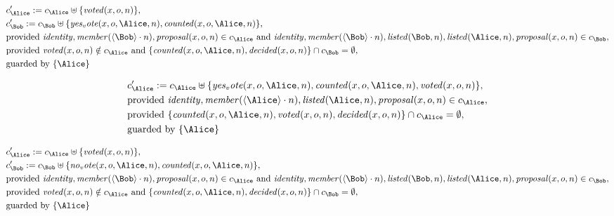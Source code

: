 \begin{align*}
&
c'_
{
\Alice
}
 := 
c_
{
\Alice
}
 \uplus 
\{
\mathit{
voted
}
(
x
,
o
,
n
)
\}
,\\
&
c'_
{
\Bob
}
 := 
c_
{
\Bob
}
 \uplus 
\{
\mathit{
yes_vote
}
(
x
,
o
,
\Alice
,
n
)
,
\mathit{
counted
}
(
x
,
o
,
\Alice
,
n
)
\}
,\\
&
\text{provided } 
\mathit{
identity
}
,
\mathit{
member
}
(
\langle
\Bob
\rangle
\cdot
n
)
,
\mathit{
proposal
}
(
x
,
o
,
n
)
 \in c_
{
\Alice
}
 \text{ and } 
\mathit{
identity
}
,
\mathit{
member
}
(
\langle
\Bob
\rangle
\cdot
n
)
,
\mathit{
listed
}
(
\Bob
,
n
)
,
\mathit{
listed
}
(
\Alice
,
n
)
,
\mathit{
proposal
}
(
x
,
o
,
n
)
 \in c_
{
\Bob
}
,\\
&
\text{provided } 
\mathit{
voted
}
(
x
,
o
,
n
)
 \notin c_
{
\Alice
}
 \text{ and } 
\{
\mathit{
counted
}
(
x
,
o
,
\Alice
,
n
)
,
\mathit{
decided
}
(
x
,
o
,
n
)
\}
 \cap c_
{
\Bob
}
 = \emptyset
,\\
&
\text{guarded by } \{
\Alice
\}
\end{align*}

\begin{align*}
&
c'_
{
\Alice
}
 := 
c_
{
\Alice
}
 \uplus 
\{
\mathit{
yes_vote
}
(
x
,
o
,
\Alice
,
n
)
,
\mathit{
counted
}
(
x
,
o
,
\Alice
,
n
)
,
\mathit{
voted
}
(
x
,
o
,
n
)
\}
,\\
&
\text{provided } 
\mathit{
identity
}
,
\mathit{
member
}
(
\langle
\Alice
\rangle
\cdot
n
)
,
\mathit{
listed
}
(
\Alice
,
n
)
,
\mathit{
proposal
}
(
x
,
o
,
n
)
 \in c_
{
\Alice
}
,\\
&
\text{provided } 
\{
\mathit{
counted
}
(
x
,
o
,
\Alice
,
n
)
,
\mathit{
voted
}
(
x
,
o
,
n
)
,
\mathit{
decided
}
(
x
,
o
,
n
)
\}
 \cap c_
{
\Alice
}
 = \emptyset
,\\
&
\text{guarded by } \{
\Alice
\}
\end{align*}

\begin{align*}
&
c'_
{
\Alice
}
 := 
c_
{
\Alice
}
 \uplus 
\{
\mathit{
voted
}
(
x
,
o
,
n
)
\}
,\\
&
c'_
{
\Bob
}
 := 
c_
{
\Bob
}
 \uplus 
\{
\mathit{
no_vote
}
(
x
,
o
,
\Alice
,
n
)
,
\mathit{
counted
}
(
x
,
o
,
\Alice
,
n
)
\}
,\\
&
\text{provided } 
\mathit{
identity
}
,
\mathit{
member
}
(
\langle
\Bob
\rangle
\cdot
n
)
,
\mathit{
proposal
}
(
x
,
o
,
n
)
 \in c_
{
\Alice
}
 \text{ and } 
\mathit{
identity
}
,
\mathit{
member
}
(
\langle
\Bob
\rangle
\cdot
n
)
,
\mathit{
listed
}
(
\Bob
,
n
)
,
\mathit{
listed
}
(
\Alice
,
n
)
,
\mathit{
proposal
}
(
x
,
o
,
n
)
 \in c_
{
\Bob
}
,\\
&
\text{provided } 
\mathit{
voted
}
(
x
,
o
,
n
)
 \notin c_
{
\Alice
}
 \text{ and } 
\{
\mathit{
counted
}
(
x
,
o
,
\Alice
,
n
)
,
\mathit{
decided
}
(
x
,
o
,
n
)
\}
 \cap c_
{
\Bob
}
 = \emptyset
,\\
&
\text{guarded by } \{
\Alice
\}
\end{align*}
